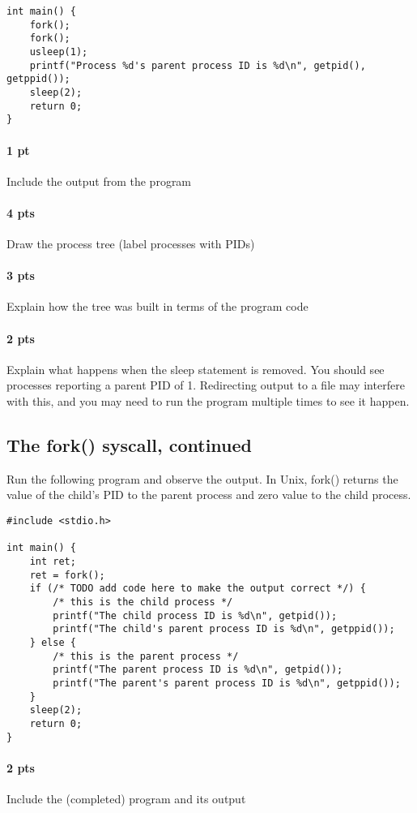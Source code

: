 \documentclass[letterpaper,10pt]{article}
\begin{document}
\begin{verbatim}
int main() {
    fork();
    fork();
    usleep(1);
    printf("Process %d's parent process ID is %d\n", getpid(), getppid());
    sleep(2);
    return 0;
}
\end{verbatim}
\paragraph{1 pt} Include the output from the program
\paragraph{4 pts} Draw the process tree (label processes with PIDs)
\paragraph{3 pts} Explain how the tree was built in terms of the program code
\paragraph{2 pts} Explain what happens when the sleep statement is removed. You should see processes reporting a parent PID of 1. Redirecting output to a file may interfere with this, and you may need to run the program multiple times to see it happen.

\subsection{The fork() syscall, continued}
Run the following program and observe the output. In Unix, fork() returns the value of the
child's PID to the parent process and zero value to the child process.
\begin{verbatim}
#include <stdio.h>

int main() {
    int ret;
    ret = fork();
    if (/* TODO add code here to make the output correct */) {
        /* this is the child process */
        printf("The child process ID is %d\n", getpid());
        printf("The child's parent process ID is %d\n", getppid());
    } else {
        /* this is the parent process */
        printf("The parent process ID is %d\n", getpid());
        printf("The parent's parent process ID is %d\n", getppid());
    }
    sleep(2);
    return 0;
}
\end{verbatim}

\paragraph{2 pts} Include the (completed) program and its output
\end{document}
